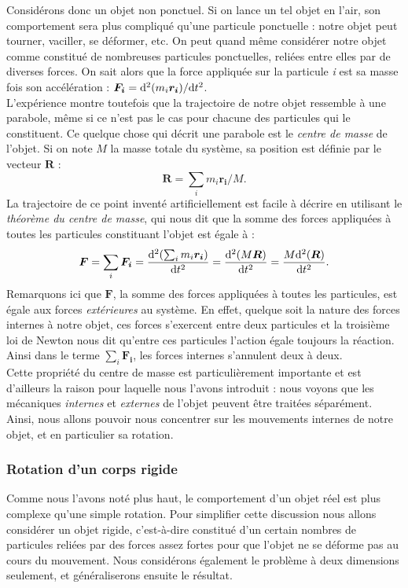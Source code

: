 Considérons donc un objet non ponctuel. Si on lance un tel objet en l'air, son comportement sera plus compliqué qu'une particule ponctuelle : notre objet peut tourner, vaciller, se déformer, etc. On peut quand même considérer notre objet comme constitué de nombreuses particules ponctuelles, reliées entre elles par de diverses forces. On sait alors que la force appliquée sur la particule \textit{i} est sa masse fois son accélération : $\bm{F_i} = \mathrm{d}^2(m_i\bm{r_i})/\mathrm{d} t^2$. \\L'expérience montre toutefois que la trajectoire de notre objet ressemble à une parabole, même si ce n'est pas le cas pour chacune des particules qui le constituent. Ce quelque chose qui décrit une parabole est le \textit{centre de masse} de l'objet. Si on note $M$ la masse totale du système, sa position est définie par le vecteur $\bm{R}$ :
\begin{equation*}
\bm{R} = \sum_i{m_i\bm{r_i}/M}.
\end{equation*}
La trajectoire de ce point inventé artificiellement est facile à décrire en utilisant le \textit{théorème du centre de masse}, qui nous dit que la somme des forces appliquées à toutes les particules constituant l'objet est égale à :
\begin{equation*}
\bm{F} = \sum_i{\bm{F_i}} = \frac{\mathrm{d}^2(\sum_i{m_i\bm{r_i}})}{\mathrm{d} t^2} = \frac{\mathrm{d}^2(M\bm{R})}{\mathrm{d} t^2} = \frac{M\mathrm{d}^2(\bm{R})}{\mathrm{d} t^2}.
\end{equation*}
Remarquons ici que $\bm{F}$, la somme des forces appliquées à toutes les particules, est égale aux forces \textit{extérieures} au système. En effet, quelque soit la nature des forces internes à notre objet, ces forces s'exercent entre deux particules et la troisième loi de Newton nous dit qu'entre ces particules l'action égale toujours la réaction. Ainsi dans le terme $\sum_i{\bm{F_i}}$, les forces internes s'annulent deux à deux.\\ Cette propriété du centre de masse est particulièrement importante et est d'ailleurs la raison pour laquelle nous l'avons introduit : nous voyons que les mécaniques \textit{internes} et \textit{externes} de l'objet peuvent être traitées séparément. Ainsi, nous allons pouvoir nous concentrer sur les mouvements internes de notre objet, et en particulier sa rotation.

\subsubsection{Rotation d'un corps rigide}
Comme nous l'avons noté plus haut, le comportement d'un objet réel est plus complexe qu'une simple rotation. Pour simplifier cette discussion nous allons considérer un objet rigide, c'est-à-dire constitué d'un certain nombres de particules reliées par des forces assez fortes pour que l'objet ne se déforme pas au cours du mouvement. Nous considérons également le problème à deux dimensions seulement, et généraliserons ensuite le résultat.

